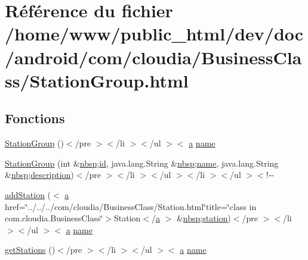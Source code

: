 \hypertarget{_station_group_8html}{\section{Référence du fichier /home/www/public\-\_\-html/dev/doc/android/com/cloudia/\-Business\-Class/\-Station\-Group.html}
\label{_station_group_8html}
}
\subsection*{Fonctions}
\begin{DoxyCompactItemize}
\item 
\hyperlink{_station_group_8html_a59562ade98b8c8a7cce2caaab6596584}{Station\-Group} ()$<$/pre $>$$<$/li $>$$<$/ul $>$$<$ \hyperlink{style_8css_a5e8981582017bb8b84c21f148345d1f7}{a} \hyperlink{_cloudia_d_b_8html_ab74e6bf80237ddc4109968cedc58c151}{name}
\item 
\hyperlink{_station_group_8html_ac9719d2bb3389a3ccb9ac0712f602aed}{Station\-Group} (int \&\hyperlink{_tools_8html_aef915316f784c9063d942974538301a6}{nbsp};\hyperlink{index-9_8html_aa9b8ff1d03b739d1e752b9d9a5aa7c98}{id}, java.\-lang.\-String \&\hyperlink{_tools_8html_aef915316f784c9063d942974538301a6}{nbsp};\hyperlink{_cloudia_d_b_8html_ab74e6bf80237ddc4109968cedc58c151}{name}, java.\-lang.\-String \&\hyperlink{_tools_8html_aef915316f784c9063d942974538301a6}{nbsp};\hyperlink{_cloudia_d_b_8html_a2661f439a4a94ffdcd5e47ae1da0bb1d}{description})$<$/pre $>$$<$/li $>$$<$/ul $>$$<$/li $>$$<$/ul $>$$<$!-\/-\/
\item 
\hyperlink{_station_group_8html_aa857dccff2c6962ecb190b79b185063c}{add\-Station} ($<$ \hyperlink{style_8css_a5e8981582017bb8b84c21f148345d1f7}{a} href=\char`\"{}../../../com/cloudia/Business\-Class/Station.\-html\char`\"{}title=\char`\"{}class in com.\-cloudia.\-Business\-Class\char`\"{}$>$Station$<$/\hyperlink{style_8css_a5e8981582017bb8b84c21f148345d1f7}{a} $>$ \&\hyperlink{_tools_8html_aef915316f784c9063d942974538301a6}{nbsp};\hyperlink{nav__app_8js_a71d7bfaa2081410e47cd5a835af1564d}{station})$<$/pre $>$$<$/li $>$$<$/ul $>$$<$ \hyperlink{style_8css_a5e8981582017bb8b84c21f148345d1f7}{a} \hyperlink{_cloudia_d_b_8html_ab74e6bf80237ddc4109968cedc58c151}{name}
\item 
\hyperlink{_station_group_8html_a0d91471293047e097baff27ac0cfa756}{get\-Stations} ()$<$/pre $>$$<$/li $>$$<$/ul $>$$<$ \hyperlink{style_8css_a5e8981582017bb8b84c21f148345d1f7}{a} \hyperlink{_cloudia_d_b_8html_ab74e6bf80237ddc4109968cedc58c151}{name}

\end{DoxyCompactItemize}
